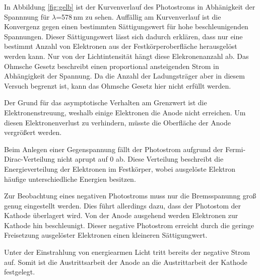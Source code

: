 \newpage
In Abbildung \ref{fig:gelb} ist der Kurvenverlauf des Photostroms in Abhänigkeit der Spannnung
für $\lambda$=578\,nm zu sehen.
\newline
Auffällig am Kurvenverlauf ist die Konvergenz gegen einen bestimmten Sättigungswert für hohe
beschleunigenden Spannungen. Dieser Sättigungswert lässt sich dadurch erklären, dass nur eine
bestimmt Anzahl von Elektronen aus der Festkörperoberfläche herausgelöst werden kann. Nur von
der Lichtintensität hängt diese Elekronenanzahl ab.
\newline Das Ohmsche Gesetz beschreibt einen proportional ansteigenden Strom in Abhängigkeit der
Spannung. Da die Anzahl der Ladungsträger aber in diesem Versuch begrenzt ist, kann das Ohmsche
Gesetz hier nicht erfüllt werden.

Der Grund für das asymptotische Verhalten am Grenzwert ist die Elektronenstreuung, weshalb
einige Elektronen die Anode nicht erreichen. Um diesen Elektronenverlust zu verhindern,
müsste die Oberfläche der Anode vergrößert werden.

Beim Anlegen einer Gegenspannung fällt der Photostrom aufgrund der Fermi-Dirac-Verteilung
nicht aprupt auf 0 ab. Diese Verteilung beschreibt die Energieverteilung der Elektronen
im Festkörper, wobei ausgelöste Elektron häufige unterschiedliche Energien besitzen.

Zur Beobachtung eines negativen Photostroms muss nur die Bremsspanunng groß genug
eingestellt werden. Dies führt allerdings dazu, dass der Photostom der Kathode überlagert wird.
Von der Anode ausgehend werden Elektronen zur Kathode hin beschleunigt. Dieser negative Photostrom
erreicht durch die geringe Freisetzung ausgelöster Elektronen einen kleineren Sättigungwert.

Unter der Einstrahlung von energiearmen Licht tritt bereits der negative Strom auf.
Somit ist die Austrittsarbeit der Anode an die Austrittarbeit der Kathode festgelegt.
